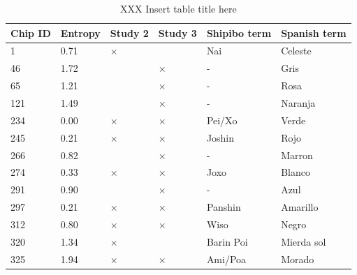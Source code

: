 \documentclass[
  english,
  ,man,floatsintext]{apa6}
\begin{document}
\begin{table}[tbp]

\begin{center}
\begin{threeparttable}

\caption{\label{tab:study1-entropy-table}XXX Insert table title here}

\begin{tabular}{llllll}
\toprule
Chip ID & \multicolumn{1}{c}{Entropy} & \multicolumn{1}{c}{Study 2} & \multicolumn{1}{c}{Study 3} & \multicolumn{1}{c}{Shipibo term} & \multicolumn{1}{c}{Spanish term}\\
\midrule
1 & 0.71 & × &  & Nai & Celeste\\
46 & 1.72 &  & × & - & Gris\\
65 & 1.21 &  & × & - & Rosa\\
121 & 1.49 &  & × & - & Naranja\\
234 & 0.00 & × & × & Pei/Xo & Verde\\
245 & 0.21 & × & × & Joshin & Rojo\\
266 & 0.82 &  & × & - & Marron\\
274 & 0.33 & × & × & Joxo & Blanco\\
291 & 0.90 &  & × & - & Azul\\
297 & 0.21 & × & × & Panshin & Amarillo\\
312 & 0.80 & × & × & Wiso & Negro\\
320 & 1.34 & × &  & Barin Poi & Mierda sol\\
325 & 1.94 & × & × & Ami/Poa & Morado\\
\bottomrule
\end{tabular}

\end{threeparttable}
\end{center}

\end{table}
\end{document}
